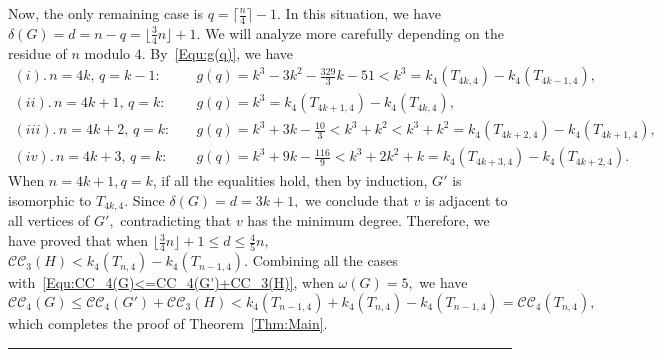 \documentclass[11pt,a4paper]{article}
\def\QED{\hfill \rule{7pt}{7pt}}
\newcommand{\turangraph}[2]{T_{#1,#2}}
\newcommand{\coveropt}[2]{{\mathcal{C}\mathcal{C}_{#1}(#2)}}
\begin{document}
Now, the only remaining case is $q=\lceil\frac{n}{4}\rceil-1.$
In this situation, we have 
$\delta(G)=d=n-q=\lfloor \frac{3}{4}n \rfloor +1.$
We will analyze more carefully depending on the residue of $n$ modulo $4.$ 
By~\eqref{Equ:g(q)}, we have
\begin{align*}
(i).\,  n=4k,\, q=k-1: \quad & g(q)=k^3-3k^2-\frac{329}{3}k-51 < k^3 = k_4(\turangraph{4k}{4}) - k_4(\turangraph{4k-1}{4}), \\
(ii).\, n=4k+1,\, q=k: \quad & g(q) = k^3 = k_4(\turangraph{4k+1}{4}) - k_4(\turangraph{4k}{4}), \\
(iii).\, n=4k+2,\, q=k: \quad & g(q) = k^3+3k-\frac{10}{3}<k^3+k^2 < k^3 + k^2 = k_4(\turangraph{4k+2}{4}) - k_4(\turangraph{4k+1}{4}), \\
(iv).\, n=4k+3,\, q=k: \quad & g(q) = k^3+9k-\frac{116}{9} < k^3 + 2k^2 + k = k_4(\turangraph{4k+3}{4}) - k_4(\turangraph{4k+2}{4}).
\end{align*}
When $n=4k+1,q=k$, if all the equalities hold,
then by induction, $G'$ is isomorphic to $\turangraph{4k}{4}.$
Since $\delta(G)=d=3k+1,$
we conclude that $v$ is adjacent to all vertices of $G',$ 
contradicting that $v$ has the minimum degree.
Therefore, we have proved that when 
$\lfloor \frac{3}{4}n \rfloor +1\leq d \leq \frac{4}{5}n,$
$\coveropt{3}{H}< k_4(\turangraph{n}{4})-k_4(\turangraph{n-1}{4}).$
Combining all the cases with~\eqref{Equ:CC_4(G)<=CC_4(G')+CC_3(H)}, 
when $\omega(G)=5,$ we have 
$$\coveropt{4}{G}\le \coveropt{4}{G'}+\coveropt{3}{H}<k_4(\turangraph{n-1}{4})+k_4(\turangraph{n}{4})-k_4(\turangraph{n-1}{4})=\coveropt{4}{\turangraph{n}{4}},$$
which completes the proof of Theorem~\ref{Thm:Main}.
\QED
\end{document}
